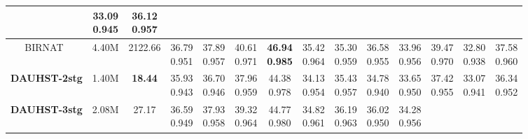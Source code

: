 \documentclass{article}
\begin{document}
\begin{table*}[t]
{\begin{tabular}{cccccccccccccc}
			&\tabincell{c}{33.09\\0.945}
			&\tabincell{c}{36.12\\0.957}
			\\
			\midrule
BIRNAT~\cite{birnat}
			& 4.40M
			& 2122.66
			&\tabincell{c}{36.79\\0.951}
			&\tabincell{c}{37.89\\0.957}
			&\tabincell{c}{40.61\\0.971}
			&\tabincell{c}{\bf{46.94}\\\bf{0.985}}
			&\tabincell{c}{35.42\\0.964}
			&\tabincell{c}{35.30\\0.959}
			&\tabincell{c}{36.58\\0.955}
			&\tabincell{c}{33.96\\0.956}
			&\tabincell{c}{39.47\\0.970}
			&\tabincell{c}{32.80\\0.938}
			&\tabincell{c}{37.58\\0.960}
			\\
			\midrule
			\rowcolor{rouse}
			\bf DAUHST-2stg 
			&  1.40M
			& \bf 18.44
			&\tabincell{c}{35.93\\0.943}
			&\tabincell{c}{36.70\\0.946}
			&\tabincell{c}{37.96\\0.959}
			&\tabincell{c}{44.38\\0.978}
			&\tabincell{c}{34.13\\0.954}
			&\tabincell{c}{35.43\\0.957}
			&\tabincell{c}{34.78\\0.940}
			&\tabincell{c}{33.65\\0.950}
			&\tabincell{c}{37.42\\0.955}
			&\tabincell{c}{33.07\\0.941}
			&\tabincell{c}{36.34\\0.952}
			\\
			\midrule
			\rowcolor{rouse}
			\bf DAUHST-3stg
			& 2.08M
			& 27.17
			&\tabincell{c}{36.59\\0.949}
			&\tabincell{c}{37.93\\0.958}
			&\tabincell{c}{39.32\\0.964}
			&\tabincell{c}{44.77\\0.980}
			&\tabincell{c}{34.82\\0.961}
			&\tabincell{c}{36.19\\0.963}
			&\tabincell{c}{36.02\\0.950}
			&\tabincell{c}{34.28\\0.956}

\end{tabular}}
\end{table*}
\end{document}
